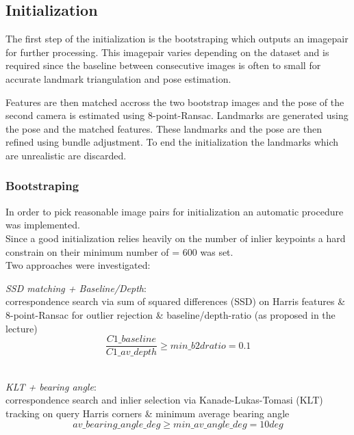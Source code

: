 \subsection{Initialization}
\label{sec_init}

The first step of the initialization is the bootstraping which outputs an imagepair for further processing. This imagepair varies depending on the dataset and is required since the baseline between consecutive images is often to small for accurate landmark triangulation and pose estimation.

Features are then matched accross the two bootstrap images and the pose of the second camera is estimated using 8-point-Ransac.
Landmarks are generated using the pose and the matched features. These landmarks and the pose are then refined using bundle adjustment. To end the initialization the landmarks which are unrealistic are discarded.

\subsubsection{Bootstraping}
\label{sec_boot}
In order to pick reasonable image pairs for initialization an automatic procedure was implemented.\\
Since a good initialization relies heavily on the number of inlier keypoints a hard constrain on their minimum number of  = $600$ was set.\\

Two approaches were investigated:
\begin{compactitem}
	\item \textit{SSD matching + Baseline/Depth}:\\
	correspondence search via sum of squared differences (SSD) on Harris features \& 8-point-Ransac for outlier rejection \& baseline/depth-ratio (as proposed in the lecture)\\
	\begin{equation}
		\frac{C1\_baseline}{C1\_av\_depth} \geqslant min\_b2dratio = 0.1
	\end{equation}\\
	
	\item \textit{KLT + bearing angle}:\\
	correspondence search and inlier selection via Kanade-Lukas-Tomasi (KLT) tracking on query Harris corners \& minimum average bearing angle\\
	\begin{equation}
		av\_bearing\_angle\_deg \geqslant min\_av\_angle\_deg = 10 deg
	\end{equation}
\end{compactitem}

